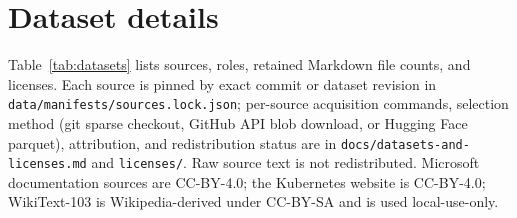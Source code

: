 \section{Dataset details}
\label{app:data}
Table~\ref{tab:datasets} lists sources, roles, retained Markdown file counts, and
licenses. Each source is pinned by exact commit or dataset revision in
\texttt{data/manifests/sources.lock.json}; per-source acquisition commands,
selection method (git sparse checkout, GitHub API blob download, or Hugging Face
parquet), attribution, and redistribution status are in
\texttt{docs/datasets-and-licenses.md} and \texttt{licenses/}. Raw source text is
not redistributed. Microsoft documentation sources are CC-BY-4.0; the Kubernetes
website is CC-BY-4.0; WikiText-103 is Wikipedia-derived under CC-BY-SA and is used
local-use-only.
